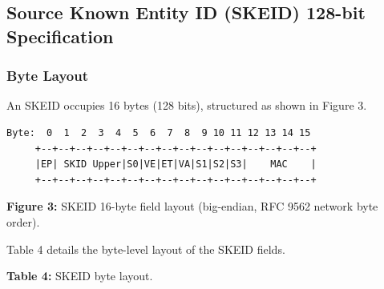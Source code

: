 \documentclass[fleqn,10pt,lineno]{wlpeerj}
\begin{document}
\subsection{Source Known Entity ID (SKEID) 128-bit
Specification}\label{source-known-entity-id-skeid-128-bit-specification}

\subsubsection{Byte Layout}\label{byte-layout}

An SKEID occupies 16 bytes (128 bits), structured as shown in Figure 3.

\begin{verbatim}
Byte:  0  1  2  3  4  5  6  7  8  9 10 11 12 13 14 15
     +--+--+--+--+--+--+--+--+--+--+--+--+--+--+--+--+
     |EP| SKID Upper|S0|VE|ET|VA|S1|S2|S3|    MAC    |
     +--+--+--+--+--+--+--+--+--+--+--+--+--+--+--+--+
\end{verbatim}

\textbf{Figure 3:} SKEID 16-byte field layout (big-endian, RFC 9562
network byte order).

Table 4 details the byte-level layout of the SKEID fields.

\textbf{Table 4:} SKEID byte layout.
\end{document}
